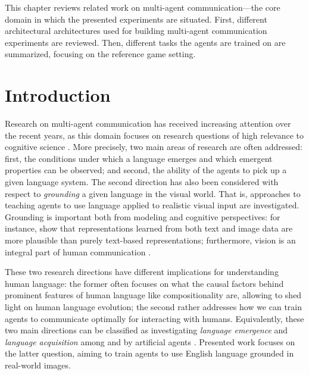 
This chapter reviews related work on multi-agent communication---the core domain in which the presented experiments are situated. First, different architectural architectures used for building multi-agent communication experiments are reviewed. Then, different tasks the agents are trained on are summarized, focusing on the reference game setting. 


\section{Introduction}
Research on multi-agent communication has received increasing attention over the recent years, as this domain focuses on research questions of high relevance to cognitive science \parencite{lazaridou2020emergent}. More precisely, two main areas of research are often addressed: first, the conditions under which a language emerges and which emergent properties can be observed; and second, the ability of the agents to pick up a given language system. %
The second direction has also been considered with respect to \textit{grounding} a given language in the visual world. That is, approaches to teaching agents to use language applied to realistic visual input are investigated. Grounding is important both from modeling and cognitive perspectives: for instance, \cite{bruni2014multimodal} show that representations learned from both text and image data are more plausible than purely text-based representations; furthermore, vision is an integral part of human communication \parencite{tomasello2010origins, harnad1990symbol}. 

These two research directions have different implications for understanding human language: the former often focuses on what the causal factors behind prominent features of human language like compositionality are, allowing to shed light on human language evolution; the second rather addresses how we can train agents to communicate optimally for interacting with humans. Equivalently, these two main directions can be classified as investigating \textit{language emergence} and \textit{language acquisition} among and by artificial agents \parencite{lazaridou2018emergence, lazaridou2020emergent}.
Presented work focuses on the latter question, aiming to train agents to use English language grounded in real-world images.

